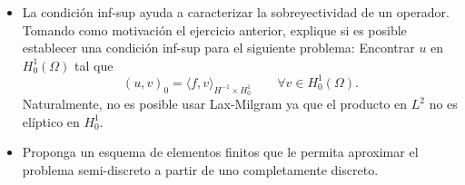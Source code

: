 \documentclass{article}
\newcommand{\pts}[1]{[{\bf #1 puntos}] }
\begin{document}
\begin{enumerate}
\begin{itemize}
                \item\pts{1} La condición inf-sup ayuda a caracterizar la sobreyectividad de un operador. Tomando como motivación el ejercicio anterior, explique si es posible establecer una condición inf-sup para el siguiente problema: Encontrar $u$ en $H_0^1(\Omega)$ tal que 
                        $$ (u, v)_0 = \langle f, v\rangle_{H^{-1}\times H_0^1} \qquad \forall v\in H_0^1(\Omega). $$
                        Naturalmente, no es posible usar Lax-Milgram ya que el producto en $L^2$ no es elíptico en $H_0^1$. 
                \item\pts{1} Proponga un esquema de elementos finitos que le permita aproximar el problema semi-discreto a partir de uno completamente discreto. 
            \end{itemize}
\end{enumerate}

\end{document}
